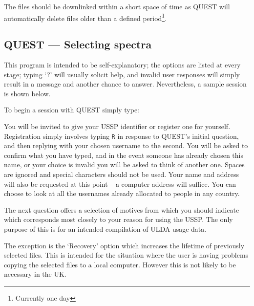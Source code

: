 \documentclass[11pt,nolof,noabs]{starlink}
\begin{document}
The files should be downlinked within a short space of time
as QUEST will automatically delete files older than a defined
period\footnote{Currently one day}.

\subsection{QUEST --- Selecting spectra}

This program is intended to be self-explanatory; the options are listed
at every stage; typing `?' will usually solicit help, and invalid user
responses will simply result in a message and another chance to answer.
Nevertheless, a sample session is shown  below.

To begin a session with QUEST simply type:
You will be invited to give your USSP identifier or register one for yourself.
Registration simply involves typing \texttt{R} in response to QUEST's initial
question, and then replying with your chosen username to the second.
You will be asked to confirm what you have typed, and in the event someone has
already chosen this name, or your choice is invalid you will be asked to think
of another one. Spaces are ignored and special characters should not be used.
Your  name and address will also be requested at this point -- a computer
address will suffice.
You can choose to look at all the usernames already allocated to
people in any country.


The next question offers a selection of motives from which you should
indicate which corresponds most closely to your reason
for using the USSP.
The only purpose of this is for an intended compilation of ULDA-usage data.

The exception is the `Recovery' option which
increases the lifetime of previously selected files.
This is intended for the situation where the user is having problems copying
the selected files to a local computer.
However this is not likely to be necessary in the UK.
\end{document}

